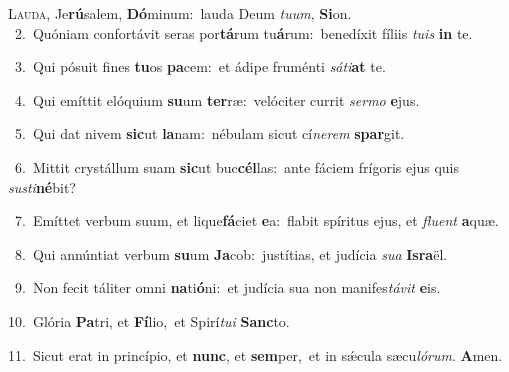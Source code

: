 \lettrine{\initial\textcolor{\initialcolor}{L}}{auda,} Je\-\textbf{rú}\-salem, \textbf{Dó}\-minum:~\star lauda Deum \textit{tu}\-\textit{um}, \textbf{Si}\-on.\\
{\numbfont\textcolor{\numbcolor}{~2.}}~Quóniam confortávit seras por\-\textbf{tá}\-rum tu\-\textbf{á}\-rum:~\star benedíxit fíliis \textit{tu}\-\textit{is} \textbf{in} te.\par
{\numbfont\textcolor{\numbcolor}{~3.}}~Qui pósuit fines \textbf{tu}\-os \textbf{pa}\-cem:~\star et ádipe fruménti \textit{sá}\-\textit{ti}\textbf{at} te.\par
{\numbfont\textcolor{\numbcolor}{~4.}}~Qui emíttit elóquium \textbf{su}\-um \textbf{ter}\-ræ:~\star velóciter currit \textit{ser}\-\textit{mo} \textbf{e}\-jus.\par
{\numbfont\textcolor{\numbcolor}{~5.}}~Qui dat nivem \textbf{sic}\-ut \textbf{la}\-nam:~\star nébulam sicut cí\-\textit{ne}\-\textit{rem} \textbf{spar}\-git.\par
{\numbfont\textcolor{\numbcolor}{~6.}}~Mittit crystállum suam \textbf{sic}\-ut buc\-\textbf{cél}\-las:~\star ante fáciem frígoris ejus quis \textit{sus}\-\textit{ti}\textbf{né}bit?\par
{\numbfont\textcolor{\numbcolor}{~7.}}~Emíttet verbum suum, et lique\-\textbf{fá}\-ciet \textbf{e}\-a:~\star flabit spíritus ejus, et \textit{flu}\-\textit{ent} \textbf{a}\-quæ.\par
{\numbfont\textcolor{\numbcolor}{~8.}}~Qui annúntiat verbum \textbf{su}\-um \textbf{Ja}\-cob:~\star justítias, et judícia \textit{su}\-\textit{a} \textbf{Is}\-\textbf{ra}ël.\par
{\numbfont\textcolor{\numbcolor}{~9.}}~Non fecit táliter omni \textbf{na}\-ti\-\textbf{ó}\-ni:~\star et judícia sua non manifes\-\textit{tá}\-\textit{vit} \textbf{e}\-is.\par
{\numbfont\textcolor{\numbcolor}{10.}}~Glória \textbf{Pa}\-tri, et \textbf{Fí}\-lio,~\star et Spirí\-\textit{tu}\-\textit{i} \textbf{Sanc}\-to.\par
{\numbfont\textcolor{\numbcolor}{11.}}~Sicut erat in princípio, et \textbf{nunc}\-, et \textbf{sem}\-per,~\star et in sǽcula sæcu\-\textit{ló}\-\textit{rum}. \textbf{A}\-men.\par
